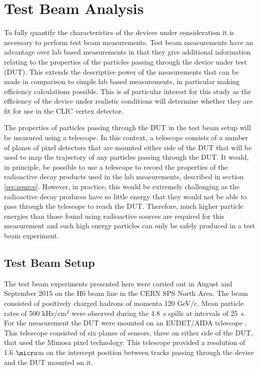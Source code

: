 
\section{Test Beam Analysis}
\label{sec:testbeam}
To fully quantify the characteristics of the devices under consideration it is necessary to perform test beam measurements.  Test beam measurements have an advantage over lab based measurements in that they give additional information relating to the properties of the particles passing through the device under test (DUT).  This extends the descriptive power of the measurements that can be made in comparison to simple lab based measurements, in particular making efficiency calculations possible.  This is of particular interest for this study as the efficiency of the device under realistic conditions will determine whether they are fit for use in the CLIC vertex detector.  

The properties of particles passing through the DUT in the test beam setup will be measured using a telescope.  In this context, a telescope consists of a number of planes of pixel detectors that are mounted either side of the DUT that will be used to map the trajectory of any particles passing through the DUT.  It would, in principle, be possible to use a telescope to record the properties of the radioactive decay products used in the lab measurements, described in section \ref{sec:source}.  However, in practice, this would be extremely challenging as the radioactive decay produces have so little energy that they would not be able to pass through the telescope to reach the DUT.  Therefore, much higher particle energies than those found using radioactive sources are required for this measurement and such high energy particles can only be safely produced in a test beam experiment. 


\subsection{Test Beam Setup}
The test beam experiments presented here were carried out in August and September 2015 on the H6 beam line in the CERN SPS North Area.  The beam consisted of positively charged hadrons of momenta 120 GeV/c.  Mean particle rates of 500 kHz/cm$^{2}$ were observed during the 4.8~s spills at intervals of 25~s.  For the measurement the DUT were mounted on an EUDET/AIDA telescope \cite{Rubinskiy:2000287}.  This telescope consisted of six planes of sensors, three on either side of the DUT, that used the Mimosa pixel technology.  This telescope provided a resolution of 1.6 $\micro$m on the intercept position between tracks passing through the device and the DUT mounted on it.  

